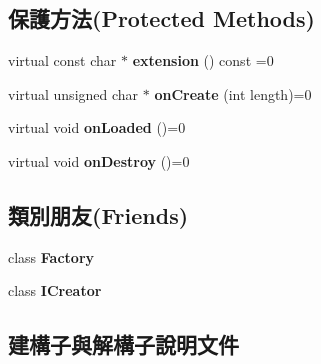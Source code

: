 \subsection*{保護方法(Protected Methods)}
\begin{DoxyCompactItemize}
\item 
virtual const char $\ast$ {\bfseries extension} () const  =0\hypertarget{class_i_dream_sky_1_1_resource_access_aa406856d5653ad3f5d7de80b0b990af2}{}\label{class_i_dream_sky_1_1_resource_access_aa406856d5653ad3f5d7de80b0b990af2}

\item 
virtual unsigned char $\ast$ {\bfseries on\+Create} (int length)=0\hypertarget{class_i_dream_sky_1_1_resource_access_a81e397bea4d71972c40e088c0bc773c9}{}\label{class_i_dream_sky_1_1_resource_access_a81e397bea4d71972c40e088c0bc773c9}

\item 
virtual void {\bfseries on\+Loaded} ()=0\hypertarget{class_i_dream_sky_1_1_resource_access_aa065a53f34f73405819f69379d231e4e}{}\label{class_i_dream_sky_1_1_resource_access_aa065a53f34f73405819f69379d231e4e}

\item 
virtual void {\bfseries on\+Destroy} ()=0\hypertarget{class_i_dream_sky_1_1_resource_access_a222af6ebcd7acdf471610f83e8dc79e7}{}\label{class_i_dream_sky_1_1_resource_access_a222af6ebcd7acdf471610f83e8dc79e7}

\end{DoxyCompactItemize}
\subsection*{類別朋友(Friends)}
\begin{DoxyCompactItemize}
\item 
class {\bfseries Factory}\hypertarget{class_i_dream_sky_1_1_resource_access_a328c093d609680cca505905c6d49901a}{}\label{class_i_dream_sky_1_1_resource_access_a328c093d609680cca505905c6d49901a}

\item 
class {\bfseries I\+Creator}\hypertarget{class_i_dream_sky_1_1_resource_access_a6d6e56ac47edfce9d2590e0757222ded}{}\label{class_i_dream_sky_1_1_resource_access_a6d6e56ac47edfce9d2590e0757222ded}

\end{DoxyCompactItemize}


\subsection{建構子與解構子說明文件}
